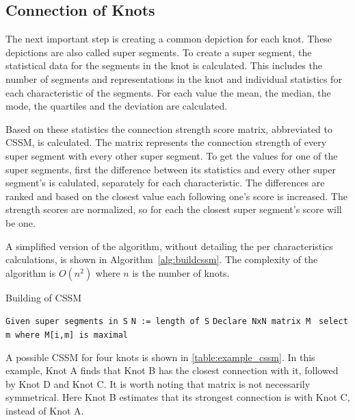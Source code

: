 \subsection{Connection of Knots} %
\label{subsec:connect_knots}

The next important step is creating a common depiction for each knot. These depictions are also called super segments. To create a super segment, the statistical data for the segments in the knot is calculated. This includes the number of segments and representations in the knot and individual statistics for each characteristic of the segments. For each value the mean, the median, the mode, the quartiles and the deviation are calculated.

Based on these statistics the connection strength score matrix, abbreviated to CSSM, is calculated. The matrix represents the connection strength of every super segment with every other super segment. To get the values for one of the super segments, first the difference between its statistics and every other super segment's is calulated, separately for each characteristic. The differences are ranked and based on the closest value each following one's score is increased. The strength scores are normalized, so for each the closest super segment's score will be one.

A simplified version of the algorithm, without detailing the per characteristics calculations, is shown in Algorithm~\ref{alg:buildcssm}. The complexity of the algorithm is $O(n^2)$ where $n$ is the number of knots.

\begin{algorithm}[H]
\caption{Building of CSSM}\label{alg:buildcssm}
\begin{algorithmic}
\State \texttt{Given super segments in S}
\State \texttt{N := length of S}
\State \texttt{Declare NxN matrix M }
        \EndIf
    \EndFor
    \State \texttt{select m where M[i,m] is maximal}
        \EndIf
    \EndFor
\EndFor
\end{algorithmic}
\end{algorithm}

A possible CSSM for four knots is shown in \autoref{table:example_cssm}. In this example, Knot A finds that Knot B has the closest connection with it, followed by Knot D and Knot C. It is worth noting that matrix is not necessarily symmetrical. Here Knot B estimates that its strongest connection is with Knot C, instead of Knot A.

